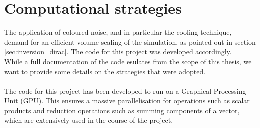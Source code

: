 \chapter{Computational strategies}
\label{chap:AppendixC}
The application of coloured noise, and in particular the cooling technique, demand for an efficient volume scaling of the simulation, as pointed out in section \ref{sec:inversion_dirac}. The code for this project was developed accordingly. \\
While a full documentation of the code esulates from the scope of this thesis, we want to provide some details on the strategies that were adopted. \\~\\
The code for this project has been developed to run on a Graphical Processing Unit (GPU). This ensures a massive parallelisation for operations such as scalar products and reduction operations such as summing components of a vector, which are extensively used in the course of the project.
